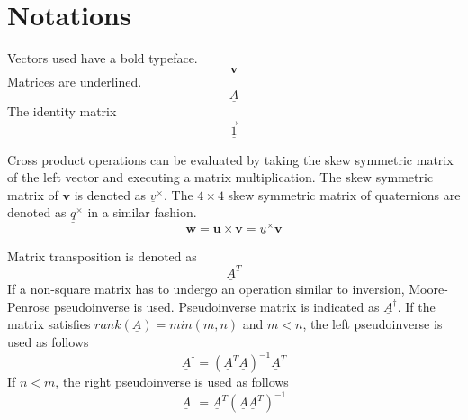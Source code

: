 \section*{Notations}

Vectors used have a bold typeface.  
\begin{equation*}
\textbf{v}
\end{equation*}
Matrices are underlined.
\begin{equation*}
\underline{A}
\end{equation*}
The identity matrix
\begin{equation*}
\underline{\vec 1}
\end{equation*}


Cross product operations can be evaluated by taking the skew symmetric matrix of the left vector and executing a matrix multiplication. The skew symmetric matrix of $\textbf{v}$ is denoted as $\underline{v}^\times$. The $4\times4$ skew symmetric matrix of quaternions are denoted as $\underline{q}^\times$ in a similar fashion.
\begin{equation*}
	\textbf{w} = \textbf{u} \times \textbf{v} = \underline{u}^\times \textbf{v}
\end{equation*}

Matrix transposition is denoted as
\begin{equation*}
\underline{A}^T
\end{equation*}
If a non-square matrix has to undergo an operation similar to inversion, Moore-Penrose pseudoinverse is used. Pseudoinverse matrix is indicated as $\underline{A}^\dagger$. If the matrix satisfies $rank(\underline{A}) = min(m,n)$ and $m < n$, the left pseudoinverse is used as follows
\begin{equation*}
\underline{A}^\dagger    =   (\underline{A}^T \underline{A} )^{-1} \underline{A}^T 
\end{equation*}
If $n < m$, the right pseudoinverse is used as follows
\begin{equation*}
 \underline{A}^\dagger    =  \underline{A}^T  (\underline{A} \underline{A}^T)^{-1}
\end{equation*}

